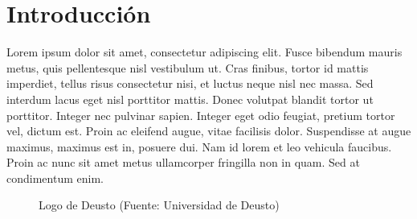 \chapter{Introducción}\label{Int}

\thispagestyle{fancy}


Lorem ipsum dolor sit amet, consectetur adipiscing elit. Fusce bibendum mauris metus, quis pellentesque nisl vestibulum ut. Cras finibus, tortor id mattis imperdiet, tellus risus consectetur nisi, et luctus neque nisl nec massa. Sed interdum lacus eget nisl porttitor mattis. Donec volutpat blandit tortor ut porttitor. Integer nec pulvinar sapien. Integer eget odio feugiat, pretium tortor vel, dictum est. Proin ac eleifend augue, vitae facilisis dolor. Suspendisse at augue maximus, maximus est in, posuere dui. Nam id lorem et leo vehicula faucibus. Proin ac nunc sit amet metus ullamcorper fringilla non in quam. Sed at condimentum enim.\\

\setlength{\fboxsep}{5pt}
\begin{figure}[thbp]
\centering
{}
\caption{Logo de Deusto (Fuente: Universidad de Deusto) \cite{Deusto}} \label{fig:Deusto}
\end{figure}


